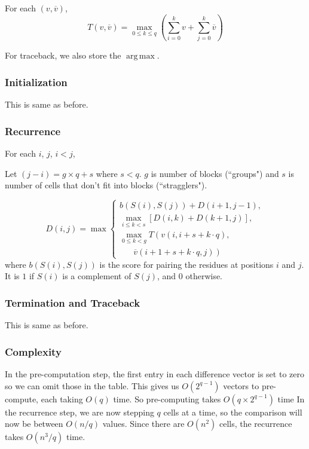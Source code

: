 \documentclass[journal]{IEEEtran}
\DeclareMathOperator*{\argmax}{arg\,max}
\begin{document}
For each $(v,\overline{v})$, 
\[
T(v,\overline{v}) = \max\limits_{0\leq k\leq q}\left(\sum\limits_{i=0}^k v + \sum\limits_{j=0}^k \overline{v}\right)
\]

For traceback, we also store the $\argmax$.

\subsubsection{Initialization}
This is same as before.

\subsubsection{Recurrence}

For each $i$, $j$, $i<j$,

Let $(j-i) = g\times q +s$ where $s<q$. $g$ is number of blocks (``groups") and $s$ is number of cells that don't fit into blocks (``stragglers").

\begin{equation}\label{recurrence2}
D(i,j) = \max \begin{cases} b(S(i),S(j)) + D(i+1,j-1),\\
\max\limits_{i\leq k<s}[D(i,k) + D(k+1, j)],\\
\max\limits_{0\leq k<g} T\left( v(i,i+s+k\cdot q)\right.,\\ 
\hspace{20pt} \left.\overline{v}(i+1+s+k\cdot q, j) \right)


\end{cases}
\end{equation}
where $b(S(i),S(j))$ is the score for pairing the residues at positions $i$ and $j$. It is $1$ if $S(i)$ is a complement of $S(j)$, and $0$ otherwise.
\subsubsection{Termination and Traceback}
This is same as before.

\subsubsection{Complexity}

In the pre-computation step, the first entry in each difference vector is set to zero so we can omit those in the table. This gives us $O(2^{q-1})$ vectors to pre-compute, each taking $O(q)$ time. So pre-computing takes $O(q\times 2^{q-1})$ time In the recurrence step, we are now stepping $q$ cells at a time, so the comparison will now be between $O(n/q)$ values. Since there are $O(n^2)$ cells, the recurrence takes $O(n^3/q)$ time.
\end{document}
